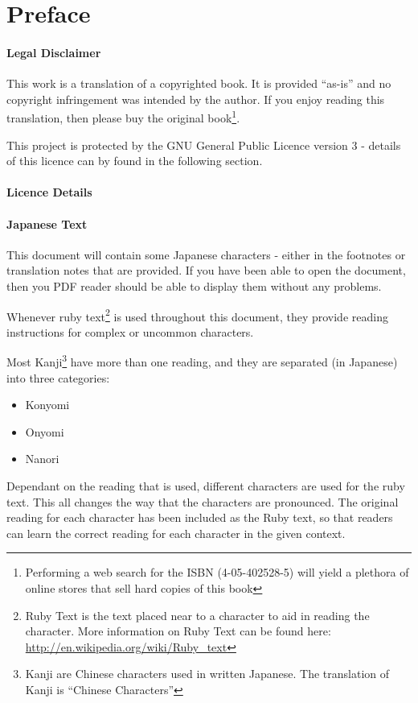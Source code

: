 \chapter*{Preface}
\subsubsection{Legal Disclaimer}
This work is a translation of a copyrighted book. It is provided ``as-is'' and no copyright infringement was intended by the author. If you enjoy reading this translation, then please buy the original book\footnote{Performing a web search for the ISBN (4-05-402528-5) will yield a plethora of online stores that sell hard copies of this book}.
\par This project is protected by the GNU General Public Licence version 3 - details of this licence can by found in the following section.
\subsubsection{Licence Details}

\subsubsection{Japanese Text}
This document will contain some Japanese characters - either in the footnotes or translation notes that are provided. If you have been able to open the document, then you PDF reader should be able to display them without any problems.
\par Whenever ruby text\footnote{Ruby Text is the text placed near to a character to aid in reading the character. More information on Ruby Text can be found here: \url{http://en.wikipedia.org/wiki/Ruby_text}} is used throughout this document, they provide reading instructions for complex or uncommon characters.
\par Most Kanji\footnote{Kanji are Chinese characters used in written Japanese. The translation of Kanji is ``Chinese Characters''} have more than one reading, and they are separated (in Japanese) into three categories:
\begin{itemize}
\item Konyomi
\item Onyomi
\item Nanori
\end{itemize}
\par Dependant on the reading that is used, different characters are used for the ruby text. This all changes the way that the characters are pronounced. The original reading for each character has been included as the Ruby text, so that readers can learn the correct reading for each character in the given context.